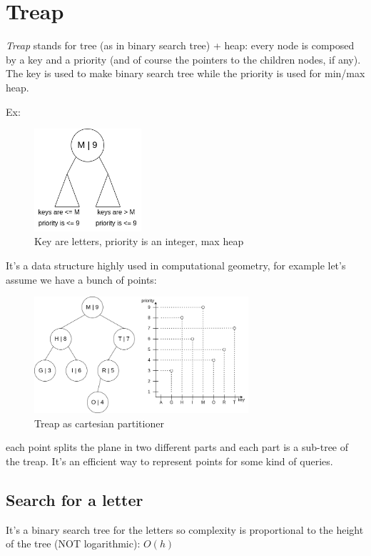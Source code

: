 \section{Treap}
\emph{Treap} stands for tree (as in binary search tree) + heap: every node is composed by a key and a priority (and of course the pointers to the children nodes, if any).
The key is used to make binary search tree while the priority is used for min/max heap.

Ex:
\begin{figure}[H]
    \centering
    \includegraphics[width=150px]{images/4_Randomized_data_structures/treap_intro.png}
    \caption{Key are letters, priority is an integer, max heap}
\end{figure}

It's a data structure highly used in computational geometry, for example let's assume we have a bunch of points:
\begin{figure}[H]
    \centering
    \includegraphics[width=300px]{images/4_Randomized_data_structures/cartesian_tree.png}
    \caption{Treap as cartesian partitioner}
\end{figure}

each point splits the plane in two different parts and each part is a sub-tree of the treap.
It's an efficient way to represent points for some kind of queries.

\subsection{Search for a letter}
It's a binary search tree for the letters so complexity is proportional to the height of the tree (NOT logarithmic): $O(h)$
    
